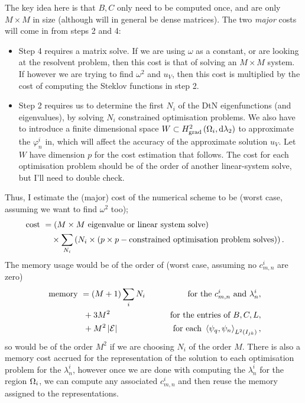 The key idea here is that $B,C$ only need to be computed once, and are only $M\times M$ in size (although will in general be dense matrices).
The two \emph{major} costs will come in from steps 2 and 4:
\begin{itemize}
	\item Step 4 requires a matrix solve.
	If we are using $\omega$ as a constant, or are looking at the resolvent problem, then this cost is that of solving an $M\times M$ system.
	If however we are trying to find $\omega^2$ and $u_V$, then this cost is multiplied by the cost of computing the Steklov functions in step 2.
	\item Step 2 requires us to determine the first $N_i$ of the DtN eigenfunctions (and eigenvalues), by solving $N_i$ constrained optimisation problems.
	We also have to introduce a finite dimensional space $W\subset H^2_\mathrm{grad}\left( \Omega_i, \mathrm{d}\lambda_2 \right)$ to approximate the $\varphi_n^i$ in, which will affect the accuracy of the approximate solution $u_V$.
	Let $W$ have dimension $p$ for the cost estimation that follows.
	The cost for each optimisation problem should be of the order of another linear-system solve, but I'll need to double check.
\end{itemize}
Thus, I estimate the (major) cost of the numerical scheme to be (worst case, assuming we want to find $\omega^2$ too);
\begin{align*}
	\text{ cost } 
	&= \left(  M\times M \text{ eigenvalue or linear system solve}  \right) \\
	& \quad\times \sum_{N_i}\left(  N_i \times (p\times p-\text{constrained optimisation problem solves})  \right).
\end{align*}
The memory usage would be of the order of (worst case, assuming no $c_{m,n}^i$ are zero)
\begin{align*}
	\text{ memory }
	&= (M+1)\sum_{i}N_i  &\qquad\text{for the } c_{m,n}^i \text{ and } \lambda_n^i, \\
	& \ + 3M^2 &\qquad\text{for the entries of } B, C, L, \\
	& \ + M^2\left\lvert \mathcal{E} \right\rvert &\qquad\text{for each } \left\langle \psi_q , \psi_n \right\rangle_{L^2\left( I_{jk} \right)},
\end{align*}
so would be of the order $M^2$ if we are choosing $N_i$ of the order $M$.
There is also a memory cost accrued for the representation of the solution to each optimisation problem for the $\lambda_n^i$, however once we are done with computing the $\lambda_n^i$ for the region $\Omega_i$, we can compute any associated $c_{m,n}^i$ and then reuse the memory assigned to the representations.

